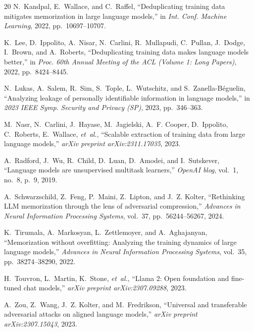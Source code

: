 \documentclass[conference]{IEEEtran}
\begin{document}
\begin{thebibliography}{20}
N.~Kandpal, E.~Wallace, and C.~Raffel, ``Deduplicating training data mitigates memorization in large language models,'' in \emph{Int. Conf. Machine Learning}, 2022, pp.~10697--10707.

K.~Lee, D.~Ippolito, A.~Nisar, N.~Carlini, R.~Mullapudi, C.~Pullan, J.~Dodge, I.~Brown, and A.~Roberts, ``Deduplicating training data makes language models better,'' in \emph{Proc. 60th Annual Meeting of the ACL (Volume 1: Long Papers)}, 2022, pp.~8424--8445.

N.~Lukas, A.~Salem, R.~Sim, S.~Tople, L.~Wutschitz, and S.~Zanella-B\'{e}guelin, ``Analyzing leakage of personally identifiable information in language models,'' in \emph{2023 IEEE Symp. Security and Privacy (SP)}, 2023, pp.~346--363.

M.~Nasr, N.~Carlini, J.~Hayase, M.~Jagielski, A.~F. Cooper, D.~Ippolito, C.~Roberts, E.~Wallace, \emph{et~al.}, ``Scalable extraction of training data from large language models,'' \emph{arXiv preprint arXiv:2311.17035}, 2023.

A.~Radford, J.~Wu, R.~Child, D.~Luan, D.~Amodei, and I.~Sutskever, ``Language models are unsupervised multitask learners,'' \emph{OpenAI blog}, vol.~1, no.~8, p.~9, 2019.

A.~Schwarzschild, Z.~Feng, P.~Maini, Z.~Lipton, and J.~Z. Kolter, ``Rethinking LLM memorization through the lens of adversarial compression,'' \emph{Advances in Neural Information Processing Systems}, vol.~37, pp.~56244--56267, 2024.

K.~Tirumala, A.~Markosyan, L.~Zettlemoyer, and A.~Aghajanyan, ``Memorization without overfitting: Analyzing the training dynamics of large language models,'' \emph{Advances in Neural Information Processing Systems}, vol.~35, pp.~38274--38290, 2022.

H.~Touvron, L.~Martin, K.~Stone, \emph{et~al.}, ``Llama 2: Open foundation and fine-tuned chat models,'' \emph{arXiv preprint arXiv:2307.09288}, 2023.

A.~Zou, Z.~Wang, J.~Z. Kolter, and M.~Fredrikson, ``Universal and transferable adversarial attacks on aligned language models,'' \emph{arXiv preprint arXiv:2307.15043}, 2023.

\end{thebibliography}
\end{document}
